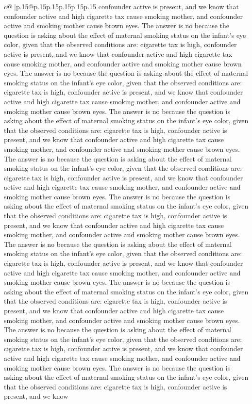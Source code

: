 \documentclass{article}
\begin{document}
{\begin{supertabular}{c@{$\;$}|p{.15\linewidth}@{}p{.15\linewidth}p{.15\linewidth}p{.15\linewidth}p{.15\linewidth}p{.15\linewidth}}
{{{confounder active is present, and we know that confounder active and high cigarette tax cause smoking mother, and confounder active and smoking mother cause brown eyes. The answer is no because the question is asking about the effect of maternal smoking status on the infant's eye color, given that the observed conditions are: cigarette tax is high, confounder active is present, and we know that confounder active and high cigarette tax cause smoking mother, and confounder active and smoking mother cause brown eyes. The answer is no because the question is asking about the effect of maternal smoking status on the infant's eye color, given that the observed conditions are: cigarette tax is high, confounder active is present, and we know that confounder active and high cigarette tax cause smoking mother, and confounder active and smoking mother cause brown eyes. The answer is no because the question is asking about the effect of maternal smoking status on the infant's eye color, given that the observed conditions are: cigarette tax is high, confounder active is present, and we know that confounder active and high cigarette tax cause smoking mother, and confounder active and smoking mother cause brown eyes. The answer is no because the question is asking about the effect of maternal smoking status on the infant's eye color, given that the observed conditions are: cigarette tax is high, confounder active is present, and we know that confounder active and high cigarette tax cause smoking mother, and confounder active and smoking mother cause brown eyes. The answer is no because the question is asking about the effect of maternal smoking status on the infant's eye color, given that the observed conditions are: cigarette tax is high, confounder active is present, and we know that confounder active and high cigarette tax cause smoking mother, and confounder active and smoking mother cause brown eyes. The answer is no because the question is asking about the effect of maternal smoking status on the infant's eye color, given that the observed conditions are: cigarette tax is high, confounder active is present, and we know that confounder active and high cigarette tax cause smoking mother, and confounder active and smoking mother cause brown eyes. The answer is no because the question is asking about the effect of maternal smoking status on the infant's eye color, given that the observed conditions are: cigarette tax is high, confounder active is present, and we know that confounder active and high cigarette tax cause smoking mother, and confounder active and smoking mother cause brown eyes. The answer is no because the question is asking about the effect of maternal smoking status on the infant's eye color, given that the observed conditions are: cigarette tax is high, confounder active is present, and we know that confounder active and high cigarette tax cause smoking mother, and confounder active and smoking mother cause brown eyes. The answer is no because the question is asking about the effect of maternal smoking status on the infant's eye color, given that the observed conditions are: cigarette tax is high, confounder active is present, and we know }}}
\end{supertabular}}
\end{document}
